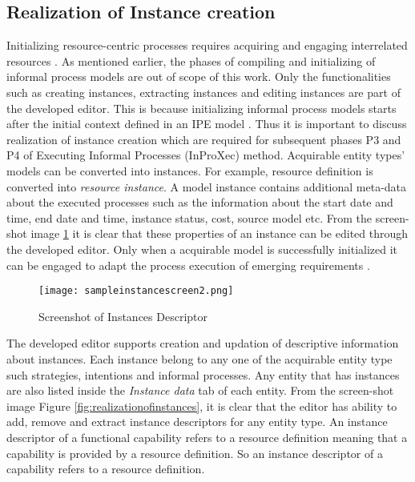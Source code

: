 		
\subsection{Realization of Instance creation}
Initializing resource-centric processes requires acquiring and engaging interrelated resources \cite{Sungur2015}. As mentioned earlier, the phases of compiling and initializing of informal process models are out of scope of this work. Only the functionalities such as creating instances, extracting instances and editing instances are part of the developed editor. This is because initializing informal process models starts after the initial context defined in an IPE model \cite{Sungur2015}. Thus it is important to discuss realization of instance creation which are required for subsequent phases P3 and P4 of Executing Informal Processes (InProXec) method. Acquirable entity types' models can be converted into instances. For example, resource definition is converted into \textit{resource instance}. A model instance contains additional meta-data about the executed processes such as the information about the start date and time, end date and time, instance status, cost, source model etc. From the screen-shot image \ref{fig:realizationofinstances2} it is clear that these properties of an instance can be edited through the developed editor. Only when a acquirable model is successfully initialized it can be engaged to adapt the process execution of emerging requirements \cite{Sungur2015}. 

\begin{figure}
	\centering
	\texttt{[image: sampleinstancescreen2.png]}
	\caption{Screenshot of Instances Descriptor}
	\label{fig:realizationofinstances2}
\end{figure}

The developed editor supports creation and updation of descriptive information about instances. Each instance belong to any one of the acquirable entity type such strategies, intentions and informal processes. Any entity that has instances are also listed inside the \textit{Instance data} tab of each entity. From the screen-shot image Figure \ref{fig:realizationofinstances}, it is clear that the editor has ability to add, remove and extract instance descriptors for any entity type. An instance descriptor of a functional capability refers to a resource definition meaning that a capability is provided by a resource definition. So an instance descriptor of a capability refers to a resource definition.

